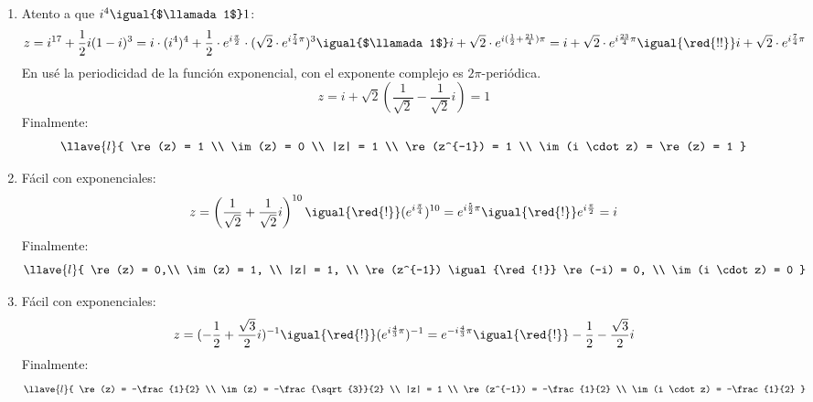 \begin{enumerate}[label=\roman*)]
  \item Atento a que $i^4 \igual{$\llamada1$} 1$:
        $$
          z = i^{17} + \frac{1}{2} i (1 - i)^3
          =
          i \cdot (i^4)^4 + \frac{1}{2} \cdot e^{i \frac{\pi}{2}} \cdot ( \sqrt{2} \cdot e^{i \frac{7}{4}\pi})^3
          \igual{$\llamada1$}
          i + \sqrt{2} \cdot e^{i ( \frac{1}{2} + \frac{21}{4}) \pi}
          =
          i + \sqrt{2} \cdot e^{i\frac{23}{4} \pi}
          \igual{\red{!!}}
          i + \sqrt{2} \cdot e^{i\frac{7}{4} \pi}
        $$
        En \red{!!} usé la periodicidad de la función exponencial, con el exponente complejo es $2\pi$-periódica.
        $$
          z = i + \sqrt{2}(\frac{1}{\sqrt{2}} - \frac{1}{\sqrt{2}}i) = 1
        $$
        Finalmente:
        $$
          \llave{l}{
            \re(z) = 1      \\
            \im(z) = 0      \\
            |z| = 1         \\
            \re(z^{-1}) = 1 \\
            \im(i \cdot z) = \re(z) = 1
          }
        $$

  \item Fácil con exponenciales:
        $$
          z
          =
          \left(\frac{1}{\sqrt{2}} + \frac{1}{\sqrt{2}}i\right)^{10}
          \igual{\red{!}}
          (e^{i \frac{\pi}{4}})^{10}
          =
          e^{i\frac{5}{2}\pi}
          \igual{\red{!}}
          e^{i\frac{\pi}{2}}
          =
          i
        $$
        Finalmente:
        $$
          \llave{l}{
            \re(z) = 0,\\
            \im(z) = 1, \\
            |z| = 1, \\
            \re(z^{-1}) \igual{\red{!}} \re(-i) = 0, \\
            \im(i \cdot z) = 0
          }
        $$

  \item Fácil con exponenciales:
        $$
          z
          =(-\frac{1}{2} + \frac{\sqrt{3}}{2}i)^{-1}
          \igual{\red{!}}
          (e^{i \frac{4}{3}\pi})^{-1}
          =
          e^{-i\frac{4}{3}\pi}
          \igual{\red{!}}
          -\frac{1}{2} - \frac{\sqrt{3}}{2}i
        $$
        Finalmente:
        $$
          \llave{l}{
            \re(z) = -\frac{1}{2}                       \\
            \im(z) = -\frac{\sqrt{3}}{2} \\
            |z| = 1                                     \\
            \re(z^{-1}) = -\frac{1}{2}                  \\
            \im(i \cdot z) = -\frac{1}{2}
          }
        $$
\end{enumerate}

\begin{aportes}
  \item {}
\end{aportes}

